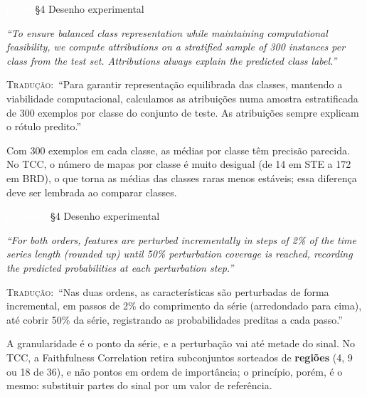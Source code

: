 \documentclass[11pt,a4paper]{article}
\newcommand{\pagechip}[1]{{\setlength{\fboxsep}{1.5pt}\colorbox{cAcc}{\textcolor{white}{\scriptsize\texttt{#1}}}}}
\newenvironment{origquote}{\par\itshape\small}{\par}
\newenvironment{tradquote}{\par\small\textsc{Tradução:}\ }{\par}
\newcommand{\explab}[1]{\par\smallskip{\small\color{cAcc}\textbf{\MakeUppercase{#1}}}\par}
\begin{document}
\begin{citacard}{\pagechip{p. 10} §4 Desenho experimental}
\begin{origquote}“To ensure balanced class representation while maintaining computational feasibility, we compute attributions on a stratified sample of 300 instances per class from the test set. Attributions always explain the predicted class label.”\end{origquote}
\begin{tradquote}“Para garantir representação equilibrada das classes, mantendo a viabilidade computacional, calculamos as atribuições numa amostra estratificada de 300 exemplos por classe do conjunto de teste. As atribuições sempre explicam o rótulo predito.”\end{tradquote}
\explab{Explicação}
Com 300 exemplos em cada classe, as médias por classe têm precisão parecida. No TCC, o número de mapas por classe é muito desigual (de 14 em STE a 172 em BRD), o que torna as médias das classes raras menos estáveis; essa diferença deve ser lembrada ao comparar classes.
\end{citacard}

\begin{citacard}{\pagechip{p. 10--11} §4 Desenho experimental}
\begin{origquote}“For both orders, features are perturbed incrementally in steps of 2\% of the time series length (rounded up) until 50\% perturbation coverage is reached, recording the predicted probabilities at each perturbation step.”\end{origquote}
\begin{tradquote}“Nas duas ordens, as características são perturbadas de forma incremental, em passos de 2\% do comprimento da série (arredondado para cima), até cobrir 50\% da série, registrando as probabilidades preditas a cada passo.”\end{tradquote}
\explab{Explicação}
A granularidade é o ponto da série, e a perturbação vai até metade do sinal. No TCC, a Faithfulness Correlation retira subconjuntos sorteados de \textbf{regiões} (4, 9 ou 18 de 36), e não pontos em ordem de importância; o princípio, porém, é o mesmo: substituir partes do sinal por um valor de referência.
\end{citacard}
\end{document}
